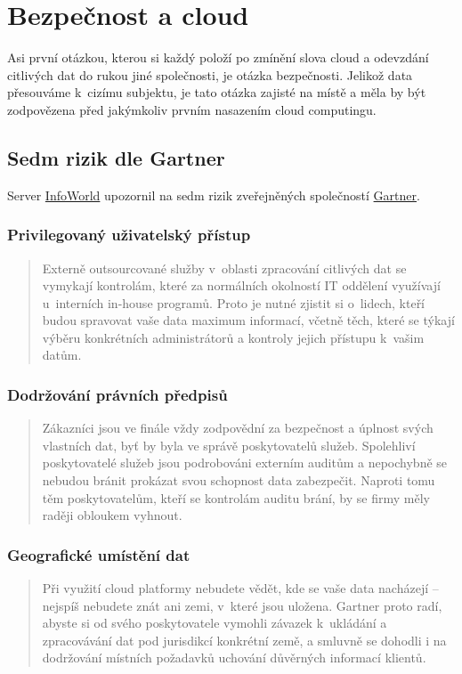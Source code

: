\section{Bezpečnost a cloud}
Asi první otázkou, kterou si každý položí po zmínění slova cloud a odevzdání citlivých dat do rukou jiné společnosti, je otázka bezpečnosti. Jelikož data přesouváme k~cizímu subjektu, je tato otázka zajisté na místě a měla by být zodpovězena před jakýmkoliv prvním nasazením cloud computingu.

\subsection{Sedm rizik dle Gartner}
Server \href{http://www.infoworld.com/d/security-central/gartner-seven-cloud-computing-security-risks-853}{InfoWorld}\cite{infoworld:7rizik} upozornil na sedm rizik zveřejněných společností \href{http://www.gartner.com/}{Gartner}.

\subsubsection{Privilegovaný uživatelský přístup}
\begin{quote}
Externě outsourcované služby v~oblasti zpracování citlivých dat se vymykají kontrolám, které za normálních okolností IT oddělení využívají u~interních in-house programů. Proto je nutné zjistit si o~lidech, kteří budou spravovat vaše data maximum informací, včetně těch, které se týkají výběru konkrétních administrátorů a kontroly jejich přístupu k~vašim datům.\cite{cloud.cz:7rizik}
\end{quote}

\subsubsection{Dodržování právních předpisů}
\begin{quote}
Zákazníci jsou ve finále vždy zodpovědní za bezpečnost a úplnost svých vlastních dat, byť by byla ve správě poskytovatelů služeb. Spolehliví poskytovatelé služeb jsou podrobováni externím auditům a nepochybně se nebudou bránit prokázat svou schopnost data zabezpečit. Naproti tomu těm poskytovatelům, kteří se kontrolám auditu brání, by se firmy měly raději obloukem vyhnout.\cite{cloud.cz:7rizik}
\end{quote}

\subsubsection{Geografické umístění dat}
\begin{quote}
Při využití cloud platformy nebudete vědět, kde se vaše data nacházejí – nejspíš nebudete znát ani zemi, v~které jsou uložena. Gartner proto radí, abyste si od svého poskytovatele vymohli závazek k~ukládání a zpracovávání dat pod jurisdikcí konkrétní země, a smluvně se dohodli i na dodržování místních požadavků uchování důvěrných informací klientů.\cite{cloud.cz:7rizik}
\end{quote}

